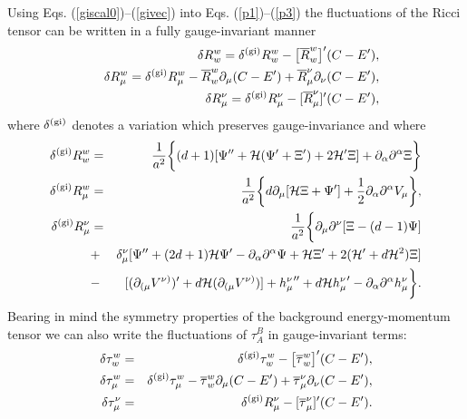 \documentclass[a4paper,12pt]{article}
\begin{document}
Using Eqs. (\ref{giscal0})--(\ref{givec}) into Eqs. (\ref{p1})--(\ref{p3}) 
the fluctuations of the Ricci tensor can be written in a fully gauge-invariant 
manner
\begin{eqnarray}
&&\delta R_{w}^{w} = \delta^{{\rm (gi)}} R_{w}^{w} - \bigl[\overline{R}_{w}^{w}
\bigr]'( C - E'), 
\label{g1}\\
&& \delta R_{\mu}^{w} 
= \delta^{{\rm (gi)}} R_{\mu}^{w} - \overline{R}_{w}^{w} 
\partial_{\mu}( C - E') + \overline{R}_{\mu}^{\nu} \partial_{\nu} ( C - E'),
\label{g2}\\
&&  \delta R_{\mu}^{\nu} 
= \delta^{{\rm (gi)}} R_{\mu}^{\nu} - [\overline{R}_{\mu}^{\nu}]' 
( C - E'),
\label{g3}
\end{eqnarray}
where $\delta^{{\rm (gi)}}$ denotes a variation which 
preserves gauge-invariance and where
\begin{eqnarray}
\delta^{{\rm (gi)}} R_{w}^{w}   &=& \frac{1}{a^2} \biggl\{ (d + 1)
[\Psi'' + {\cal H} ( \Psi' + \Xi') + 2 {\cal H}' \Xi] + 
\partial_{\alpha}\partial^{\alpha} \Xi\biggr\}
\label{gir1}\\
\delta^{{\rm (gi)}} R_{\mu}^{w} &=& \frac{1}{a^2}\biggl\{ d \partial_{\mu}[
{\cal H} \Xi + \Psi'] + \frac{1}{2} \partial_{\alpha}\partial^{\alpha} V_{\mu}
\biggr\},
\label{gir2}\\
 \delta^{{\rm (gi)}} R_{\mu}^{\nu} &=& \frac{1}{a^2} \biggl\{  
\partial_{\mu} \partial^{\nu} [ \Xi 
- ( d - 1) \Psi]
\nonumber\\
&+&\delta_{\mu}^{\nu} [ \Psi'' + ( 2 d + 1) {\cal H} \Psi' - 
\partial_{\alpha} \partial^{\alpha} \Psi + {\cal H} \Xi' + 
2 ( {\cal H}' + d {\cal H}^2) \Xi] 
\nonumber\\
&-& [ (\partial_{(\mu}V^{\nu)})' + d {\cal H} 
(\partial_{(\mu} V^{\nu)})] +{h_{\mu}^{\nu}}''
+ d {\cal H} {h_{\mu}^{\nu}}' - \partial_{\alpha} \partial^{\alpha} 
h_{\mu}^{\nu}  \biggr\}.
\label{gir3}
\end{eqnarray}
Bearing in mind the symmetry properties of the background energy-momentum 
tensor we can also write the fluctuations of $\tau_{A}^{B}$ in 
gauge-invariant terms:
\begin{eqnarray}
\delta \tau_{w}^{w} &=& \delta^{({\rm gi})} \tau_{w}^{w} -
 \bigl[\overline{\tau}_{w}^{w}\bigr]'( C - E'), 
\label{t1}\\
\delta \tau_{\mu}^{w} 
&=& \delta^{{\rm (gi)}} \tau_{\mu}^{w} - \overline{\tau}_{w}^{w} 
\partial_{\mu}( C - E') + \overline{\tau}_{\mu}^{\nu} \partial_{\nu} ( C - E'),
\label{t2}\\
\delta \tau_{\mu}^{\nu} 
&=& \delta^{{\rm (gi)}} R_{\mu}^{\nu} - [\overline{\tau}_{\mu}^{\nu}]' 
( C - E').
\label{t3}
\end{eqnarray}
\end{document}
